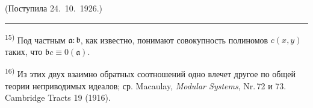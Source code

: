 \documentclass[11pt]{article}
\newcommand{\foreign}[1]{#1}
\theoremstyle{plain}
\begin{document}
\vfill
\begin{flushright}
(Поступила 24.\ 10.\ 1926.)
\end{flushright}

\vspace{0.5em}
\noindent\rule{\textwidth}{0.4pt}
\vspace{0.3em}

{\footnotesize
\textsuperscript{15)} Под частным $\mathfrak{a}:\mathfrak{b}$, как известно,
понимают совокупность полиномов $c(x,y)$ таких, что
$\mathfrak{b}c \equiv 0(\mathfrak{a})$.

\textsuperscript{16)} Из этих двух взаимно обратных соотношений одно
влечет другое по общей теории неприводимых идеалов; ср. Macaulay,
\textit{Modular Systems}, Nr.\,72 и 73. \foreign{Cambridge Tracts} 19 (1916).
}
\end{document}
